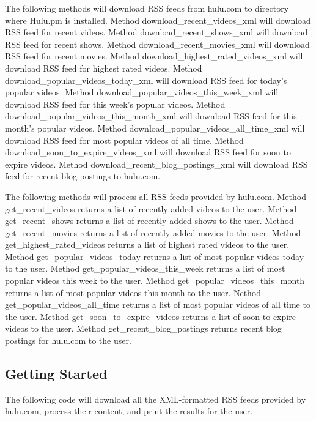 The following methods will download RSS feeds from hulu.com to directory where Hulu.pm is installed.
Method download\_recent\_videos\_xml will download RSS feed for recent videos.
Method download\_recent\_shows\_xml will download RSS feed for recent shows.
Method download\_recent\_movies\_xml will download RSS feed for recent movies.
Method download\_highest\_rated\_videos\_xml will download RSS feed for highest rated videos.
Method download\_popular\_videos\_today\_xml will download RSS feed for today's popular videos.
Method download\_popular\_videos\_this\_week\_xml will download RSS feed for this week's popular videos.
Method download\_popular\_videos\_this\_month\_xml will download RSS feed for this month's popular videos.
Method download\_popular\_videos\_all\_time\_xml will download RSS feed for most popular videos of all time.
Method download\_soon\_to\_expire\_videos\_xml will download RSS feed for soon to expire videos.
Method download\_recent\_blog\_postings\_xml will download RSS feed for recent blog postings to hulu.com.



The following methods will process all RSS feeds provided by hulu.com.
Method get\_recent\_videos returns a list of recently added videos to the user.
Method get\_recent\_shows returns a list of recently added shows to the user.
Method get\_recent\_movies returns a list of recently added movies to the user.
Method get\_highest\_rated\_videos returns a list of highest rated videos to the user.
Method get\_popular\_videos\_today returns a list of most popular videos today to the user.
Method get\_popular\_videos\_this\_week returns a list of most popular videos this week to the user.
Method get\_popular\_videos\_this\_month returns a list of most popular videos this month to the user.
Nethod get\_popular\_videos\_all\_time returns a list of most popular videos of all time to the user.
Method get\_soon\_to\_expire\_videos returns a list of soon to expire videos to the user.
Method get\_recent\_blog\_postings returns recent blog postings for hulu.com to the user.

\subsection*{Getting Started\label{Getting_Started}}


The following code will download all the XML-formatted RSS feeds provided by hulu.com,
process their content, and print the results for the user.


